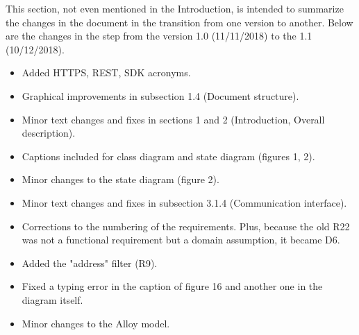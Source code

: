 
%

This section, not even mentioned in the Introduction, is intended to summarize the changes in the document in the transition from one version to another. Below are the changes in the step from the version 1.0 (11/11/2018) to the 1.1 (10/12/2018).

\begin{itemize}
\item Added HTTPS, REST, SDK acronyms.
\item Graphical improvements in subsection 1.4 (Document structure).
\item Minor text changes and fixes in sections 1 and 2 (Introduction, Overall description).
\item Captions included for class diagram and state diagram (figures 1, 2).
\item Minor changes to the state diagram (figure 2).
\item Minor text changes and fixes in subsection 3.1.4 (Communication interface).
\item Corrections to the numbering of the requirements. Plus, because the old R22 was not a functional requirement but a domain assumption, it became D6.
\item Added the "address" filter (R9).
\item Fixed a typing error in the caption of figure 16 and another one in the diagram itself.
\item Minor changes to the Alloy model.
\end{itemize}

%